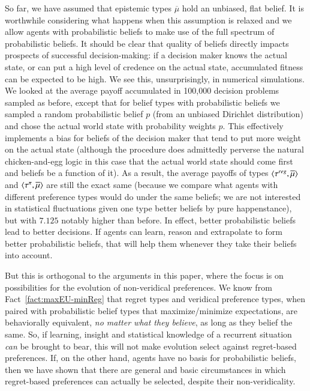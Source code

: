 \documentclass[fleqn,reqno,11pt]{article}
\begin{document}
So far, we have assumed that epistemic types $\overline{\mu}$ hold an unbiased, flat belief. It is
worthwhile considering what happens when this assumption is relaxed and we allow agents with
probabilistic beliefs to make use of the full spectrum of probabilistic beliefs. It should be
clear that quality of beliefs directly impacts prospects of successful decision-making: if a
decision maker knows the actual state, or can put a high level of credence on the actual state,
accumulated fitness can be expected to be high. We see this, unsurprisingly, in numerical
simulations. We looked at the average payoff accumulated in 100,000 decision problems sampled
as before, except that for belief types with probabilistic beliefs we sampled a random
probabilistic belief $p$ (from an unbiased Dirichlet distribution) and chose the actual world
state with probability weights $p$. This effectively implements a bias for beliefs of the
decision maker that tend to put more weight on the actual state (although the procedure does
admittedly perverse the natural chicken-and-egg logic in this case that the actual world state
should come first and beliefs be a function of it). As a result, the average payoffs of types
$\left \langle \tau^{reg}, \overline{\mu}\right\rangle$ and $\left \langle \tau^{\pi}, \overline{\mu}\right\rangle$ are still the exact same
(because we compare what agents with different preference types would do under the same
beliefs; we are not interested in statistical fluctuations given one type better beliefs by
pure happenstance), but with $7.125$ notably higher than before. In effect, better
probabilistic beliefs lead to better decisions. If agents can learn, reason and extrapolate to
form better probabilistic beliefs, that will help them whenever they take their beliefs into
account. 

But this is orthogonal to the arguments in this paper, where the focus is on possibilities for
the evolution of non-veridical preferences. We know from Fact~\ref{fact:maxEU-minReg} that
regret types and veridical preference types, when paired with probabilistic belief types that
maximize/minimize expectations, are behaviorally equivalent, \emph{no matter what they believe},
as long as they belief the same. So, if learning, insight and statistical knowledge of a
recurrent situation \emph{can} be brought to bear, this will not make evolution select against
regret-based preferences. If, on the other hand, agents have no basis for probabilistic
beliefs, then we have shown that there are general and basic circumstances in which
regret-based preferences can actually be selected, despite their non-veridicality.
\end{document}
